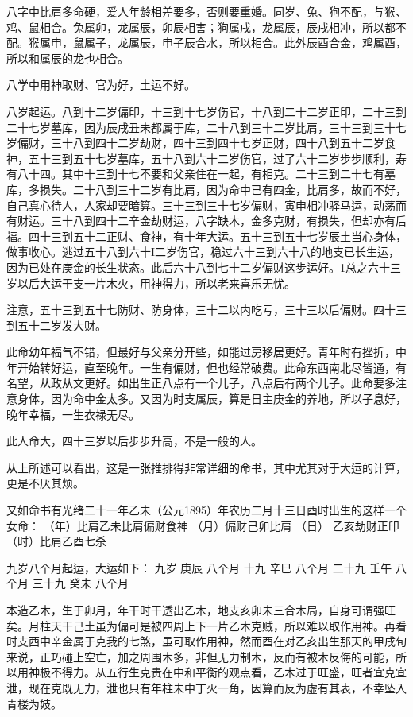 \documentclass[a5paper,oneside,12pt]{ctexbook}
\begin{document}
八字中比肩多命硬，爱人年龄相差要多，否则要重婚。同岁、兔、狗不配，与猴、鸡、鼠相合。兔属卯，龙属辰，卯辰相害；狗属戌，龙属辰，辰戌相冲，所以都不配。猴属申，鼠属子，龙属辰，申子辰合水，所以相合。此外辰酉合金，鸡属酉，所以和属辰的龙也相合。

八学中用神取财、官为好，土运不好。

八岁起运。八到十二岁偏印，十三到十七岁伤官，十八到二十二岁正印，二十三到二十七岁墓库，因为辰戌丑未都属于库，二十八到三十二岁比肩，三十三到三十七岁偏财，三十八到四十二岁劫财，四十三到四十七岁正财，四十八到五十二岁食神，五十三到五十七岁墓库，五十八到六十二岁伤官，过了六十二岁步步顺利，寿有八十四。其中十三到十七不要和父亲住在一起，有相克。二十三到二十七有墓库，多损失。二十八到三十二岁有比肩，因为命中已有四金，比肩多，故而不好，自己真心待人，人家却要暗算。三十三到三十七岁偏财，寅申相冲驿马运，动荡而有财运。三十八到四十二辛金劫财运，八字缺木，金多克财，有损失，但却亦有后福。四十三到五十二正财、食神，有十年大运。五十三到五十七岁辰土当心身体，做事收心。逃过五十八到六十I二岁伤官，稳过六十三到六十八的地支已长生运，因为已处在庚金的长生状态。此后六十八到七十二岁偏财这步运好。1总之六十三岁以后大运干支一片木火，用神得力，所以老来喜乐无忧。

注意，五十三到五十七防财、防身体，三十二以内吃亏，三十三以后偏财。四十三到五十二岁发大财。

此命幼年福气不错，但最好与父亲分开些，如能过房移居更好。青年时有挫折，中年开始转好运，直至晚年。一生有偏财，但也经常破费。此命东西南北尽皆通，有名望，从政从文更好。如出生正八点有一个儿子，八点后有两个儿子。此命要多注意身体，因为命中金太多。又因为时支属辰，算是日主庚金的养地，所以子息好，晚年幸福，一生衣禄无尽。

此人命大，四十三岁以后步步升高，不是一般的人。

从上所述可以看出，这是一张推排得非常详细的命书，其中尤其对于大运的计算，更是不厌其烦。

又如命书有光绪二十一年乙未（公元1895）年农历二月十三日酉时出生的这样一个女命：
（年）比肩乙未比肩偏财食神
（月）偏财己卯比肩
（日）	乙亥劫财正印
（时）比肩乙酉七杀

九岁八个月起运，大运如下：
九岁	庚辰
八个月
十九	辛巳
八个月
二十九	壬午
八个月
三十九	癸未
八个月

本造乙木，生于卯月，年干时干透出乙木，地支亥卯未三合木局，自身可谓强旺矣。月柱天干己土虽为偏可是被四周上下一片乙木克贼，所以难以取作用神。再看时支西中辛金属于克我的七煞，虽可取作用神，然而酉在对乙亥出生那天的甲戌旬来说，正巧碰上空亡，加之周围木多，非但无力制木，反而有被木反侮的可能，所以用神极不得力。从五行生克贵在中和平衡的观点看，乙木过于旺盛，旺者宜克宜泄，现在克既无力，泄也只有年柱未中丁火一角，因算而反为虚有其表，不幸坠入青楼为妓。
\end{document}
